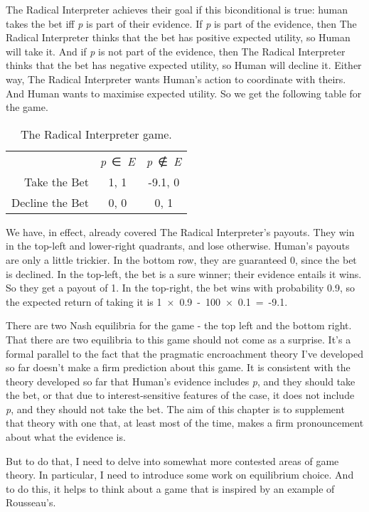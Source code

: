 \documentclass[
  12pt,
  letterpaper,
]{scrbook}
\begin{document}
The Radical Interpreter achieves their goal if this biconditional is
true: human takes the bet iff \emph{p} is part of their evidence. If
\emph{p} is part of the evidence, then The Radical Interpreter thinks
that the bet has positive expected utility, so Human will take it. And
if \emph{p} is not part of the evidence, then The Radical Interpreter
thinks that the bet has negative expected utility, so Human will decline
it. Either way, The Radical Interpreter wants Human's action to
coordinate with theirs. And Human wants to maximise expected utility. So
we get the following table for the game.

\begin{longtable}[]{@{}rcc@{}}
\caption{The Radical Interpreter
game.}\label{tbl-radical-interpreter}\tabularnewline
\toprule\noalign{}
\endfirsthead
\endhead
\bottomrule\noalign{}
\endlastfoot
& \emph{p}~∈~\emph{E} & \emph{p}~∉~\emph{E} \\
Take the Bet & 1, 1 & -9.1, 0 \\
Decline the Bet & 0, 0 & 0, 1 \\
\end{longtable}

We have, in effect, already covered The Radical Interpreter's payouts.
They win in the top-left and lower-right quadrants, and lose otherwise.
Human's payouts are only a little trickier. In the bottom row, they are
guaranteed 0, since the bet is declined. In the top-left, the bet is a
sure winner; their evidence entails it wins. So they get a payout of 1.
In the top-right, the bet wins with probability 0.9, so the expected
return of taking it is 1~×~0.9~-~100~×~0.1~=~-9.1.

There are two Nash equilibria for the game - the top left and the bottom
right. That there are two equilibria to this game should not come as a
surprise. It's a formal parallel to the fact that the pragmatic
encroachment theory I've developed so far doesn't make a firm prediction
about this game. It is consistent with the theory developed so far that
Human's evidence includes \emph{p}, and they should take the bet, or
that due to interest-sensitive features of the case, it does not include
\emph{p}, and they should not take the bet. The aim of this chapter is
to supplement that theory with one that, at least most of the time,
makes a firm pronouncement about what the evidence is.

But to do that, I need to delve into somewhat more contested areas of
game theory. In particular, I need to introduce some work on equilibrium
choice. And to do this, it helps to think about a game that is inspired
by an example of Rousseau's.
\end{document}
